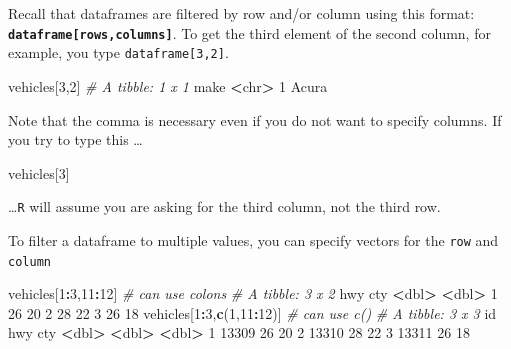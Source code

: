 \documentclass[
]{book}
\newenvironment{Shaded}{\begin{snugshade}}{\end{snugshade}}
\newcommand{\CommentTok}[1]{\textcolor[rgb]{0.56,0.35,0.01}{\textit{#1}}}
\newcommand{\DecValTok}[1]{\textcolor[rgb]{0.00,0.00,0.81}{#1}}
\newcommand{\ErrorTok}[1]{\textcolor[rgb]{0.64,0.00,0.00}{\textbf{#1}}}
\newcommand{\KeywordTok}[1]{\textcolor[rgb]{0.13,0.29,0.53}{\textbf{#1}}}
\newcommand{\NormalTok}[1]{#1}
\newcommand{\OperatorTok}[1]{\textcolor[rgb]{0.81,0.36,0.00}{\textbf{#1}}}
\newcommand{\StringTok}[1]{\textcolor[rgb]{0.31,0.60,0.02}{#1}}
\begin{document}
Recall that dataframes are filtered by row and/or column using this format: \textbf{\texttt{dataframe{[}rows,columns{]}}}. To get the third element of the second column, for example, you type \texttt{dataframe{[}3,2{]}}.

\begin{Shaded}
\begin{Highlighting}[]
\NormalTok{vehicles[}\DecValTok{3}\NormalTok{,}\DecValTok{2}\NormalTok{]}
\CommentTok{# A tibble: 1 x 1}
\NormalTok{  make }
  \OperatorTok{<}\NormalTok{chr}\OperatorTok{>}
\DecValTok{1}\NormalTok{ Acura}
\end{Highlighting}
\end{Shaded}

Note that the comma is necessary even if you do not want to specify columns. If you try to type this \ldots{}

\begin{Shaded}
\begin{Highlighting}[]
\NormalTok{vehicles[}\DecValTok{3}\NormalTok{]}
\end{Highlighting}
\end{Shaded}

\ldots{}\texttt{R} will assume you are asking for the third column, not the third row.

To filter a dataframe to multiple values, you can specify vectors for the \texttt{row} and \texttt{column}

\begin{Shaded}
\begin{Highlighting}[]
\NormalTok{vehicles[}\DecValTok{1}\OperatorTok{:}\DecValTok{3}\NormalTok{,}\DecValTok{11}\OperatorTok{:}\DecValTok{12}\NormalTok{] }\CommentTok{# can use colons}
\CommentTok{# A tibble: 3 x 2}
\NormalTok{    hwy   cty}
  \OperatorTok{<}\NormalTok{dbl}\OperatorTok{>}\StringTok{ }\ErrorTok{<}\NormalTok{dbl}\OperatorTok{>}
\DecValTok{1}    \DecValTok{26}    \DecValTok{20}
\DecValTok{2}    \DecValTok{28}    \DecValTok{22}
\DecValTok{3}    \DecValTok{26}    \DecValTok{18}
\NormalTok{vehicles[}\DecValTok{1}\OperatorTok{:}\DecValTok{3}\NormalTok{,}\KeywordTok{c}\NormalTok{(}\DecValTok{1}\NormalTok{,}\DecValTok{11}\OperatorTok{:}\DecValTok{12}\NormalTok{)]  }\CommentTok{# can use c()}
\CommentTok{# A tibble: 3 x 3}
\NormalTok{     id   hwy   cty}
  \OperatorTok{<}\NormalTok{dbl}\OperatorTok{>}\StringTok{ }\ErrorTok{<}\NormalTok{dbl}\OperatorTok{>}\StringTok{ }\ErrorTok{<}\NormalTok{dbl}\OperatorTok{>}
\DecValTok{1} \DecValTok{13309}    \DecValTok{26}    \DecValTok{20}
\DecValTok{2} \DecValTok{13310}    \DecValTok{28}    \DecValTok{22}
\DecValTok{3} \DecValTok{13311}    \DecValTok{26}    \DecValTok{18}
\end{Highlighting}
\end{Shaded}
\end{document}
